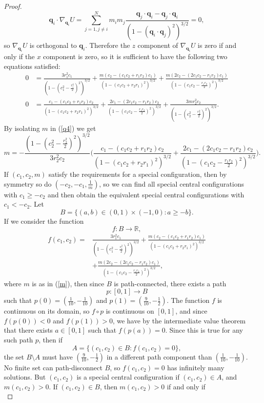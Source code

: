 \documentclass[12pt]{amsart}
\theoremstyle{definition}
\def \mb{\mathbb}
\def \R{\mb R}                 %
\newcommand {\q} {\mathbf{q}}
\begin{document}
{\begin{proof}
$$
\q_i \cdot \nabla_{\q_i} U=\sum\limits_{j=1, j\neq i}^N m_im_j\frac{\q_j \cdot \q_i-\q_j \cdot \q_i}{(1-(\q_i \cdot \q_j)^2)^{3/2}}=0,
$$
so $\nabla_{\q_i} U$ is orthogonal to $\q_i$. Therefore the $z$ component of $\nabla_{\q_i} U$ is zero if and only if the $x$ component is zero, so it is sufficient to have the following two equations satisfied:
\begin{align}
\label{q1}0&=\frac{3r_1^2c_1}{(1-(c_1^2-\frac{r_1^2}{2})^2)^{3/2}}+\frac{m(c_2-(c_1c_2+r_1r_2)c_1)}{(1-(c_1c_2+r_2r_1)^2)^{3/2}}+\frac{m(2c_2-(2c_1c_2-r_1r_2)c_1)}{(1-(c_1c_2-\frac{r_1r_2}{2})^2)^{3/2}}\\
\label{q4}0&=\frac{c_1-(c_1c_2+r_1r_2)c_2}{(1-(c_1c_2+r_2r_1)^2)^{3/2}}+\frac{2c_1-(2c_1c_2-r_1r_2)c_2}{(1-(c_1c_2-\frac{r_1r_2}{2})^2)^{3/2}}+\frac{3mr_2^2c_2}{(1-(c_2^2-\frac{r_2^2}{2})^2)^{3/2}}.
\end{align}
By isolating $m$ in (\ref{q4}) we get \begin{equation}
\label{m}m=-\frac{(1-(c_2^2-\frac{r_2^2}{2})^2)^{3/2}}{3r_2^2c_2}\biggl(\frac{c_1-(c_1c_2+r_1r_2)c_2}{(1-(c_1c_2+r_2r_1)^2)^{3/2}}+\frac{2c_1-(2c_1c_2-r_1r_2)c_2}{(1-(c_1c_2-\frac{r_1r_2}{2})^2)^{3/2}}\biggr).
\end{equation}
If $(c_1,c_2,m)$ satisfy the requirements for a special configuration, then by symmetry so do $(-c_2,-c_1,\frac{1}{m})$, so we can find all special central configurations with $c_1 \geq -c_2$ and then obtain the equivalent special central configurations with $c_1<-c_2$. Let 
$$
B=\{(a,b) \in (0,1) \times (-1,0): a\geq -b\}.
$$ 
If we consider the function 
$$
f\colon B \to \R,
$$  
\begin{align*}
f(c_1,c_2)=&\frac{3r_1^2c_1}{(1-(c_1^2-\frac{r_1^2}{2})^2)^{3/2}}+\frac{m(c_2-(c_1c_2+r_1r_2)c_1)}{(1-(c_1c_2+r_2r_1)^2)^{3/2}}\\
&+\frac{m(2c_2-(2c_1c_2-r_1r_2)c_1)}{(1-(c_1c_2-\frac{r_1r_2}{2})^2)^{3/2}},\end{align*}
where $m$ is as in (\ref{m}), then since $B$ is path-connected, there exists a path 
$$
p:[0,1] \to B
$$
such that $p(0)=(\frac{1}{10},-\frac{1}{10})$ and $p(1)=(\frac{9}{10},-\frac{1}{2})$. The function $f$ is continuous on its domain, so $f \circ p$ is continuous on $[0,1]$, and since $f(p(0))<0$ and $f(p(1))>0$, we have by the intermediate value theorem that there exists $a \in [0,1]$ such that $f(p(a))=0$. Since this is true for any such path $p$, then if
$$
A=\{(c_1,c_2) \in B: f(c_1,c_2)=0\},$$
the set $B\setminus A$ must have $(\frac{9}{10}, -\frac{1}{2})$ in a different path component than $(\frac{1}{10}, -\frac{1}{10})$. No finite set can path-disconnect $B$, so $f(c_1,c_2)=0$ has infinitely many solutions. But $(c_1,c_2)$ is a special central configuration if $(c_1,c_2) \in A$, and $m(c_1,c_2) >0$. If $(c_1,c_2) \in B$, then $m(c_1,c_2)>0$ if and only if \begin{equation*}

\end{equation*}
\end{proof}}
\end{document}
